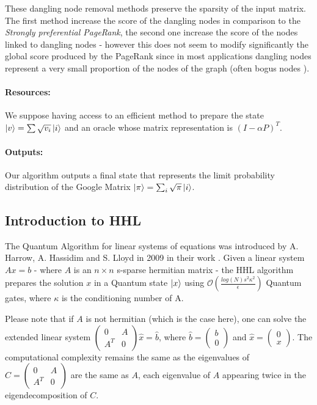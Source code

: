 \documentclass{article}
\begin{document}
These dangling node removal methods preserve the sparsity of the input matrix. The first method increase the score of the dangling nodes in comparison to the \textit{Strongly preferential PageRank}, the second one increase the score of the nodes linked to dangling nodes - however this does not seem to modify significantly the global score produced by the PageRank since in most applications dangling nodes represent a very small proportion of the nodes of the graph (often bogus nodes \cite{brin_page_1998}).

\paragraph{Resources:}
We suppose having access to an efficient method to prepare the state $\ket{v} = \sum \sqrt{v_i} \ket{i}$ and an oracle whose matrix representation is $(I - \alpha P)^T$.

\paragraph{Outputs:}
Our algorithm outputs a final state that represents the limit probability distribution of the Google Matrix $\ket{\pi} = \sum_i \sqrt{\pi} \ket{i}$.

\subsection{Introduction to HHL}

The Quantum Algorithm for linear systems of equations was introduced by A. Harrow, A. Hassidim and S. Lloyd in 2009 in their work \cite{Harrow_2009}. Given a linear system $Ax = b$ - where $A$ is an $n \times n$ s-sparse hermitian matrix - the HHL algorithm prepares the solution $x$ in a Quantum state $\ket{x}$ using $\mathcal{O}(\frac{log(N) s^2 \kappa^2}{\epsilon})$ Quantum gates, where $\kappa$ is the conditioning number of A.

Please note that if $A$ is not hermitian (which is the case here), one can solve the extended linear system $\begin{pmatrix} 0 & A \\ A^T & 0 \end{pmatrix} \hat{x} = \hat{b}$, where $\hat{b} = \begin{pmatrix} b \\ 0 \end{pmatrix}$ and $\hat{x} = \begin{pmatrix} 0 \\ x \end{pmatrix}$. The computational complexity remains the same as the eigenvalues of $C = \begin{pmatrix} 0 & A \\ A^T & 0 \end{pmatrix}$ are the same as $A$, each eigenvalue of $A$ appearing twice in the eigendecomposition of $C$.
\end{document}
